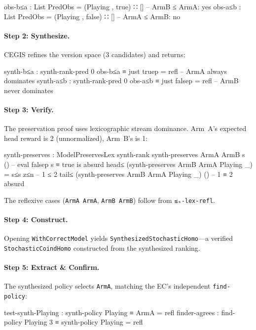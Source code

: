 \documentclass[9pt,a4paper]{article}
\theoremstyle{plain}
\theoremstyle{definition}
\theoremstyle{remark}
\begin{document}
\begin{spec}
obs-b≤a : List PredObs = (Playing , true) ∷ []    -- ArmB ≤ ArmA: yes
obs-a≤b : List PredObs = (Playing , false) ∷ []   -- ArmA ≤ ArmB: no
\end{spec}

\paragraph{Step 2: Synthesize.}  CEGIS refines the version space (3 candidates) and returns:

\begin{spec}
synth-b≤a : synth-rank-pred 0 obs-b≤a ≡ just truep   = refl    -- ArmA always dominates
synth-a≤b : synth-rank-pred 0 obs-a≤b ≡ just falsep   = refl    -- ArmB never dominates
\end{spec}

\paragraph{Step 3: Verify.}  The preservation proof uses lexicographic stream dominance.  Arm~A's expected head reward is 2 (unnormalized), Arm~B's is 1:

\begin{spec}
synth-preserves : ModelPreservesLex synth-rank
synth-preserves ArmA ArmB s ()        -- eval falsep s ≡ true is absurd
head≤ (synth-preserves ArmB ArmA Playing _) = s≤s z≤n         -- 1 ≤ 2
tail≤ (synth-preserves ArmB ArmA Playing _) ()                -- 1 ≡ 2 absurd
\end{spec}

\noindent The reflexive cases (\texttt{ArmA ArmA}, \texttt{ArmB ArmB}) follow from \texttt{≤ₛ-lex-refl}.

\paragraph{Step 4: Construct.}  Opening \texttt{WithCorrectModel} yields \texttt{SynthesizedStochasticHomo}---a verified \texttt{StochasticCoindHomo} constructed from the synthesized ranking.

\paragraph{Step 5: Extract \& Confirm.}  The synthesized policy selects \texttt{ArmA}, matching the EC's independent \texttt{find-policy}:

\begin{spec}
test-synth-Playing : synth-policy Playing ≡ ArmA     = refl
finder-agrees : find-policy Playing 3 ≡ synth-policy Playing  = refl
\end{spec}
\end{document}
